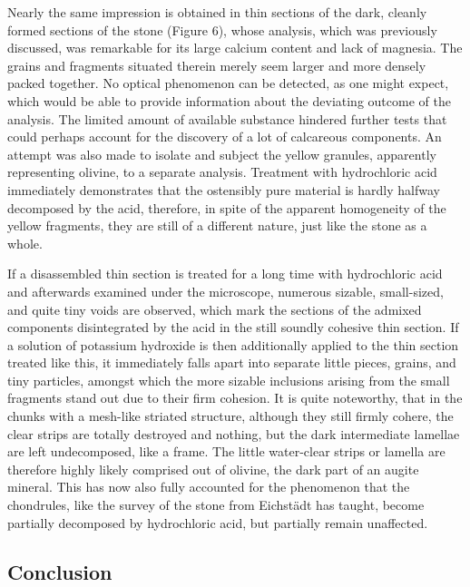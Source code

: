 \documentclass[a4paper, 12pt, oneside]{article}
\begin{document}
Nearly the same impression is obtained in thin sections of the dark, cleanly formed sections of the stone (Figure 6), whose analysis, which was previously discussed, was remarkable for its large calcium content and lack of magnesia. The grains and fragments situated therein merely seem larger and more densely packed together. No optical phenomenon can be detected, as one might expect, which would be able to provide information about the deviating outcome of the analysis. The limited amount of available substance hindered further tests that could perhaps account for the discovery of a lot of calcareous components. An attempt was also made to isolate and subject the yellow granules, apparently representing olivine, to a separate analysis. Treatment with hydrochloric acid immediately demonstrates that the ostensibly pure material is hardly halfway decomposed by the acid, therefore, in spite of the apparent homogeneity of the yellow fragments, they are still of a different nature, just like the stone as a whole.

If a disassembled thin section is treated for a long time with hydrochloric acid and afterwards examined under the microscope, numerous sizable, small-sized, and quite tiny voids are observed, which mark the sections of the admixed components disintegrated by the acid in the still soundly cohesive thin section. If a solution of potassium hydroxide is then additionally applied to the thin section treated like this, it immediately falls apart into separate little pieces, grains, and tiny particles, amongst which the more sizable inclusions arising from the small fragments stand out due to their firm cohesion. It is quite noteworthy, that in the chunks with a mesh-like striated structure, although they still firmly cohere, the clear strips are totally destroyed and nothing, but the dark intermediate lamellae are left undecomposed, like a frame. The little water-clear strips or lamella are therefore highly likely comprised out of olivine, the dark part of an augite mineral. This has now also fully accounted for the phenomenon that the chondrules, like the survey of the stone from Eichstädt has taught, become partially decomposed by hydrochloric acid, but partially remain unaffected.
\clearpage

\subsection{Conclusion}
\end{document}
